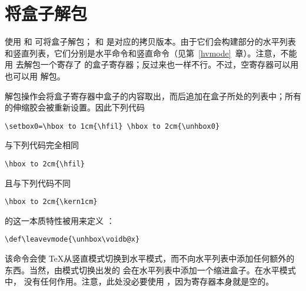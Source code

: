 \documentclass{book}
\begin{document}
\section{将盒子解包}

使用  和  可将盒子解包； 和  是对应的拷贝版本。由于它们会构建部分的水平列表和竖直列表，它们分别是水平命令和竖直命令（见第~\ref{hvmode}~章）。注意，不能用  去解包一个寄存了  的盒子寄存器；反过来也一样不行。不过，空寄存器可以用  也可以用  解包。

解包操作会将盒子寄存器中盒子的内容取出，而后追加在盒子所处的列表中；所有的伸缩胶会被重新设置。因此下列代码
\begin{verbatim}
\setbox0=\hbox to 1cm{\hfil} \hbox to 2cm{\unhbox0}
\end{verbatim}
与下列代码完全相同
\begin{verbatim}
\hbox to 2cm{\hfil}
\end{verbatim}
且与下列代码不同
\begin{verbatim}
\hbox to 2cm{\kern1cm}
\end{verbatim}

 的这一本质特性被用来定义 ：
\begin{verbatim}
\def\leavevmode{\unhbox\voidb@x}
\end{verbatim}
该命令会使 \TeX 从竖直模式切换到水平模式，而不向水平列表中添加任何额外的东西。当然，由模式切换出发的  会在水平列表中添加一个缩进盒子。在水平模式中， 没有任何作用。注意，此处没必要使用 ，因为寄存器本身就是空的。
\end{document}
